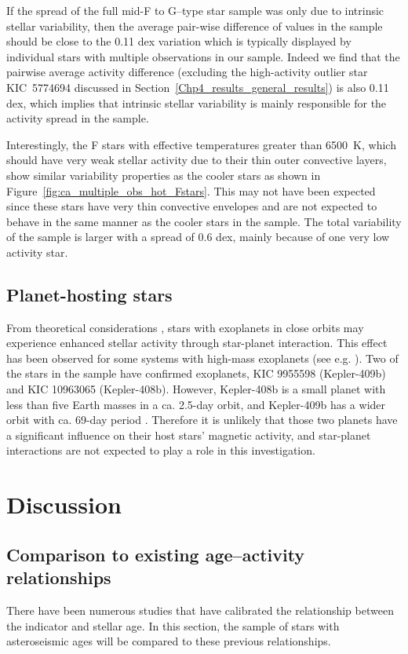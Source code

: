 If the spread of the full mid-F to G--type star sample was only due to intrinsic stellar variability, then the average pair-wise difference of \Rprime values in the sample should be close to the 0.11 dex variation which is typically displayed by individual stars with multiple observations in our sample. Indeed we find that the pairwise average activity difference (excluding the high-activity outlier star KIC~5774694 discussed in Section~\ref{Chp4_results_general_results}) is also 0.11 dex, which implies that intrinsic stellar variability is mainly responsible for the activity spread in the sample.

Interestingly, the F stars with effective temperatures greater than 6500~K, which should have very weak stellar activity due to their thin outer convective layers, show similar variability properties as the cooler stars as shown in Figure~\ref{fig:ca_multiple_obs_hot_Fstars}. This may not have been expected since these stars have very thin convective envelopes and are not expected to behave in the same manner as the cooler stars in the sample. The total variability of the sample is larger with a spread of 0.6 dex, mainly because of one very low activity star. 

\subsection{Planet-hosting stars}
From theoretical considerations \citep{Cuntz_etal_2000}, stars with exoplanets in close orbits may experience enhanced stellar activity through star-planet interaction. This effect has been observed for some systems with high-mass exoplanets (see e.g. \citealt{Poppenhaeger_Wolk_2014,Pillitteri_etal_2015}). Two of the stars in the sample have confirmed exoplanets, KIC 9955598 (Kepler-409b) and KIC 10963065 (Kepler-408b). However, Kepler-408b is a small planet with less than five Earth masses in a ca. 2.5-day orbit, and Kepler-409b has a wider orbit with ca. 69-day period \citep{Marcy_etal_2014}. Therefore it is unlikely that those two planets have a significant influence on their host stars' magnetic activity, and star-planet interactions are not expected to play a role in this investigation.

\section{Discussion}
\label{Chp4_discussion}

\subsection{Comparison to existing age--activity relationships}
\label{Chp4_discus_previous_relations}
There have been numerous studies that have calibrated the relationship between the \Rprime indicator and stellar age. In this section, the sample of stars with asteroseismic ages will be compared to these previous relationships.

